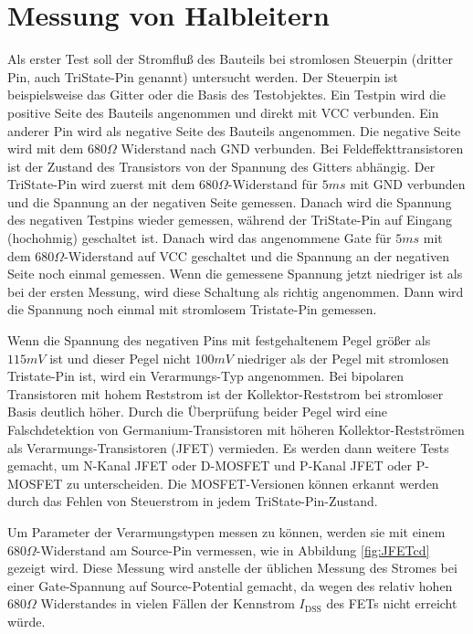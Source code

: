 \section{Messung von Halbleitern}
Als erster Test soll der Stromfluß des Bauteils bei stromlosen Steuerpin (dritter Pin, auch TriState-Pin genannt)
untersucht werden. Der Steuerpin ist beispielsweise das Gitter oder die Basis des Testobjektes.
Ein Testpin wird die positive Seite des Bauteils angenommen und direkt mit VCC verbunden.
Ein anderer Pin wird als negative Seite des Bauteils angenommen.
Die negative Seite wird mit dem \(680\Omega\) Widerstand nach GND verbunden.
Bei Feldeffekttransistoren ist der Zustand des Transistors von der Spannung des Gitters abhängig.
Der TriState-Pin wird zuerst mit dem \(680\Omega\)-Widerstand für \(5ms\) mit GND verbunden und
die Spannung an der negativen Seite gemessen.
Danach wird die Spannung des negativen Testpins wieder gemessen, während der TriState-Pin auf
Eingang (hochohmig) geschaltet ist.
Danach wird das angenommene Gate für \(5ms\) mit dem \(680\Omega\)-Widerstand auf VCC geschaltet 
und die Spannung an der negativen Seite noch einmal gemessen.
Wenn die gemessene Spannung jetzt niedriger ist als bei der ersten Messung, wird diese Schaltung
als richtig angenommen. Dann wird die Spannung noch einmal mit stromlosem Tristate-Pin gemessen.

Wenn die Spannung des negativen Pins mit festgehaltenem Pegel größer als \(115mV\) ist
und dieser Pegel nicht \(100mV\) niedriger als der Pegel mit stromlosen Tristate-Pin ist,
wird ein Verarmungs-Typ angenommen.
Bei bipolaren Transistoren mit hohem Reststrom ist
der Kollektor-Reststrom bei stromloser Basis deutlich höher.
Durch die Überprüfung beider Pegel wird eine Falschdetektion von Germanium-Transistoren mit
höheren Kollektor-Restströmen als Verarmungs-Transistoren (JFET) vermieden.
Es werden dann weitere Tests gemacht,
um N-Kanal JFET oder D-MOSFET und P-Kanal JFET oder P-MOSFET zu unterscheiden.
Die MOSFET-Versionen können erkannt werden durch das Fehlen von Steuerstrom in jedem 
TriState-Pin-Zustand.

Um Parameter der Verarmungstypen messen zu können, werden sie mit einem \(680\Omega\)-Widerstand am
Source-Pin vermessen, wie in Abbildung \ref{fig:JFETcd} gezeigt wird. Diese Messung wird anstelle der
üblichen Messung des Stromes bei einer Gate-Spannung auf Source-Potential gemacht, da wegen des
relativ hohen \(680\Omega\) Widerstandes in vielen Fällen der Kennstrom \(I_\mathrm{DSS}\) 
des FETs nicht erreicht würde.

